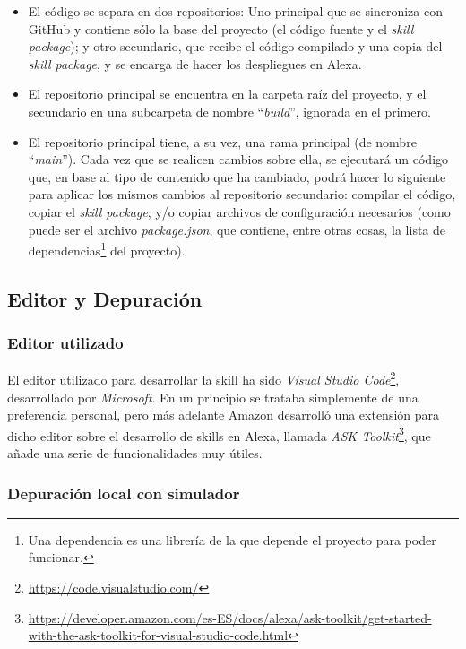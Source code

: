 \documentclass[11pt,spanish,listoffigures,listoftables,table,hyphens,dvipsnames]{tfgetsinf}
\begin{document}
\begin{itemize}
   \item El código se separa en dos repositorios: Uno principal que se sincroniza con GitHub y contiene sólo la base del proyecto (el código fuente y el \emph{skill package}); y otro secundario, que recibe el código compilado y una copia del \emph{skill package}, y se encarga de hacer los despliegues en Alexa.
   \item El repositorio principal se encuentra en la carpeta raíz del proyecto, y el secundario en una subcarpeta de nombre ``\emph{build}'', ignorada en el primero.
   \item El repositorio principal tiene, a su vez, una rama principal (de nombre ``\emph{main}''). Cada vez que se realicen cambios sobre ella, se ejecutará un código que, en base al tipo de contenido que ha cambiado, podrá hacer lo siguiente para aplicar los mismos cambios al repositorio secundario: compilar el código, copiar el \emph{skill package}, y/o copiar archivos de configuración necesarios (como puede ser el archivo \emph{package.json}, que contiene, entre otras cosas, la lista de dependencias\footnote{Una dependencia es una librería de la que depende el proyecto para poder funcionar.} del proyecto).
\end{itemize}

\subsection{Editor y Depuración}

\subsubsection{Editor utilizado}

El editor utilizado para desarrollar la skill ha sido \emph{Visual Studio Code}\footnote{\url{https://code.visualstudio.com/}}, desarrollado por \emph{Microsoft}. En un principio se trataba simplemente de una preferencia personal, pero más adelante Amazon desarrolló una extensión para dicho editor sobre el desarrollo de skills en Alexa, llamada
\emph{ASK Toolkit}\footnote{\url{https://developer.amazon.com/es-ES/docs/alexa/ask-toolkit/get-started-with-the-ask-toolkit-for-visual-studio-code.html}},
que añade una serie de funcionalidades muy útiles.

\subsubsection{Depuración local con simulador}
\end{document}
